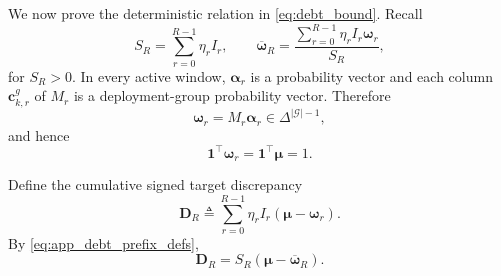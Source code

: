 \documentclass[letterpaper,journal]{IEEEtran}
\begin{document}
We now prove the deterministic relation in
\eqref{eq:debt_bound}.  Recall
\begin{equation}
    S_R
    =
    \sum_{r=0}^{R-1}\eta_rI_r,
    \qquad
    \overline{\boldsymbol\omega}_R
    =
    \frac{
    \sum_{r=0}^{R-1}
    \eta_rI_r\boldsymbol\omega_r
    }{S_R},
    \label{eq:app_debt_prefix_defs}
\end{equation}
for $S_R>0$.  In every active window,
$\boldsymbol\alpha_r$ is a probability vector and each column
$\mathbf{c}_{k,r}^{g}$ of $M_r$ is a deployment-group probability vector.
Therefore
\begin{equation}
    \boldsymbol\omega_r
    =
    M_r\boldsymbol\alpha_r
    \in
    \Delta^{|\mathcal G|-1},
    \label{eq:app_omega_simplex}
\end{equation}
and hence
\begin{equation}
    \mathbf{1}^{\top}\boldsymbol\omega_r
    =
    \mathbf{1}^{\top}\boldsymbol\mu
    =1.
    \label{eq:app_equal_mass}
\end{equation}

Define the cumulative signed target discrepancy
\begin{equation}
    \mathbf{D}_R
    \triangleq
    \sum_{r=0}^{R-1}
    \eta_rI_r
    \left(
    \boldsymbol\mu-\boldsymbol\omega_r
    \right).
    \label{eq:app_DR}
\end{equation}
By \eqref{eq:app_debt_prefix_defs},
\begin{equation}
    \mathbf{D}_R
    =
    S_R
    \left(
    \boldsymbol\mu-\overline{\boldsymbol\omega}_R
    \right).
    \label{eq:app_DR_baromega}
\end{equation}
\end{document}
